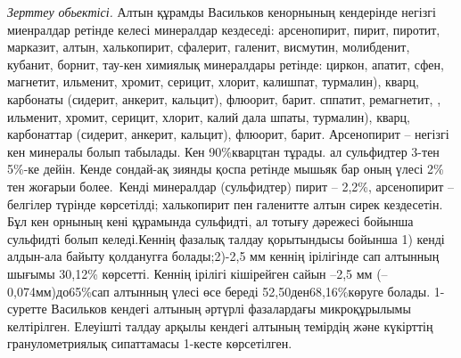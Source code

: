\begin{multicols}{2}
\emph{Зерттеу обьектісі.} Алтын құрамды Васильков кенорнының кендерінде
негізгі миенралдар ретінде келесі минералдар кездеседі: арсенопирит,
пирит, пиротит, марказит, алтын, халькопирит, сфалерит, галенит,
висмутин, молибденит, кубанит, борнит, тау-кен химиялық минералдары
ретінде: циркон, апатит, сфен, магнетит, ильменит, хромит, серицит,
хлорит, калишпат, турмалин), кварц, карбонаты (сидерит, анкерит,
кальцит), флюорит, барит. сппатит, ремагнетит, , ильменит, хромит,
серицит, хлорит, калий дала шпаты, турмалин), кварц, карбонаттар
(сидерит, анкерит, кальцит), флюорит, барит. Арсенопирит -- негізгі кен
минералы болып табылады. Кен 90\%кварцтан тұрады. ал сульфидтер 3-тен
5\%-ке дейін. Кенде сондай-ақ зиянды қоспа ретінде мышьяк бар оның үлесі
2\% тен жоғарыи более.~Кенді минералдар (сульфидтер) пирит -- 2,2\%,
арсенопирит -- белгілер түрінде көрсетілді; халькопирит пен галенитте
алтын сирек кездесетін. Бұл кен орнының кені құрамында сульфидті, ал
тотығу дәрежесі бойынша сульфидті болып келеді.Кеннің фазалық талдау
қорытындысы бойынша 1) кенді алдын-ала байыту қолданугға болады;2)-2,5
мм кеннің ірілігінде сап алтынның шығымы 30,12\% көрсетті. Кеннің
ірілігі кішірейген сайын --2,5 мм (--0,074мм)до65\%сап алтынның үлесі
өсе береді 52,50ден68,16\%көруге болады. 1-суретте Васильков кендегі
алтының әртүрлі фазалардағы микроқұрылымы келтірілген. Елеуішті талдау
арқылы кендегі алтының темірдің және күкірттің гранулометриялық
сипаттамасы 1-кесте көрсетілген.
\end{multicols}

